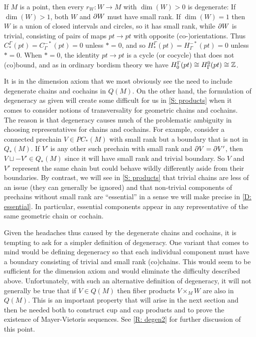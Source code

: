 \begin{example}\label{E: dimension}
	If $M$ is a point, then every $r_W \colon W \to M$ with $\dim(W)>0$ is degenerate: If $\dim(W)>1$, both $W$ and $\partial W$ must have small rank.
	If $\dim(W) = 1$ then $W$ is a union of closed intervals and circles, so it has small rank, while $\partial W$ is trivial, consisting of pairs of maps $pt \to pt$ with opposite (co-)orientations.
	Thus $C_*^\Gamma(pt) = C^{-*}_\Gamma(pt) = 0$ unless $* = 0$, and so $H_*^\Gamma(pt) = H^{-*}_\Gamma(pt) = 0$ unless $* = 0$.
	When $* = 0$, the identity $pt \to pt$ is a cycle (or cocycle) that does not (co)bound, and as in ordinary bordism theory we have $H_0^\Gamma(pt) \cong H^0_\Gamma(pt) \cong \mathbb{Z}$.
\end{example}

\begin{remark}\label{R: degen1}
	It is in the dimension axiom that we most obviously see the need to include degenerate chains and cochains in $Q(M)$.
	On the other hand, the formulation of degeneracy as given will create some difficult for us in \cref{S: products} when it comes to consider notions of transversality for geometric chains and cochains.
	The reason is that degeneracy causes much of the problematic ambiguity in choosing representatives for chains and cochains.
	For example, consider a connected prechain $V \in PC_*(M)$ with small rank but a boundary that is not in $Q_*(M)$.
	If $V'$ is any other such prechain with small rank and $\partial V = \partial V'$, then $V \sqcup -V' \in Q_*(M)$ since it will have small rank and trivial boundary.
	So $V$ and $V'$ represent the same chain but could behave wildly differently aside from their boundaries.
	By contrast, we will see in \cref{S: products} that trivial chains are less of an issue (they can generally be ignored) and that non-trivial components of prechains without small rank are ``essential'' in a sense we will make precise in \cref{D: essential}.
	In particular, essential components appear in any representative of the same geometric chain or cochain.

	Given the headaches thus caused by the degenerate chains and cochains, it is tempting to ask for a simpler definition of degeneracy.
	One variant that comes to mind would be defining degeneracy so that each individual component must have a boundary consisting of trivial and small rank (co)chains.
	This would seem to be sufficient for the dimension axiom and would eliminate the difficulty described above.
	Unfortunately, with such an alternative definition of degeneracy, it will not generally be true that if $V \in Q(M)$ then fiber products $V \times_M W$ are also in $Q(M)$.
	This is an important property that will arise in the next section and then be needed both to construct cup and cap products and to prove the existence of Mayer-Vietoris sequences.
	See \cref{R: degen2} for further discussion of this point.
\end{remark}

